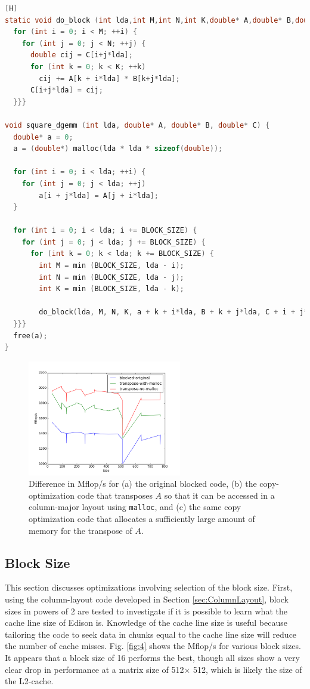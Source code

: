 \documentclass[10pt]{article}
\begin{document}
\begin{lstlisting}[language=C, basicstyle=\small][H]
static void do_block (int lda,int M,int N,int K,double* A,double* B,double* C) {
  for (int i = 0; i < M; ++i) {
    for (int j = 0; j < N; ++j) {
      double cij = C[i+j*lda];
      for (int k = 0; k < K; ++k)
        cij += A[k + i*lda] * B[k+j*lda];
      C[i+j*lda] = cij;
  }}}

void square_dgemm (int lda, double* A, double* B, double* C) {
  double* a = 0;
  a = (double*) malloc(lda * lda * sizeof(double));

  for (int i = 0; i < lda; ++i) {
    for (int j = 0; j < lda; ++j)
        a[i + j*lda] = A[j + i*lda];
  }

  for (int i = 0; i < lda; i += BLOCK_SIZE) {
    for (int j = 0; j < lda; j += BLOCK_SIZE) {
      for (int k = 0; k < lda; k += BLOCK_SIZE) {
        int M = min (BLOCK_SIZE, lda - i);
        int N = min (BLOCK_SIZE, lda - j);
        int K = min (BLOCK_SIZE, lda - k);

        do_block(lda, M, N, K, a + k + i*lda, B + k + j*lda, C + i + j*lda);
  }}}
  free(a);
}
\end{lstlisting}

\begin{figure}[H]
\centering
\includegraphics[width=0.6\textwidth]{figures/transpose-no-malloc.png}
\caption{Difference in Mflop/s for (a) the original blocked code, (b) the copy-optimization code that transposes \(A\) so that it can be accessed in a column-major layout using {\tt malloc}, and (c) the same copy optimization code that allocates a sufficiently large amount of memory for the transpose of \(A\).}
\label{fig:3}
\end{figure}
 
\subsection{Block Size}
This section discusses optimizations involving selection of the block size. First, using the column-layout code developed in Section \ref{sec:ColumnLayout}, block sizes in powers of 2 are tested to investigate if it is possible to learn what the cache line size of Edison is. Knowledge of the cache line size is useful because tailoring the code to seek data in chunks equal to the cache line size will reduce the number of cache misses. Fig. \ref{fig:4} shows the Mflop/s for various block sizes. It appears that a block size of 16 performs the best, though all sizes show a very clear drop in performance at a matrix size of 512\(\times\) 512, which is likely the size of the L2-cache. 
 
\end{document}
